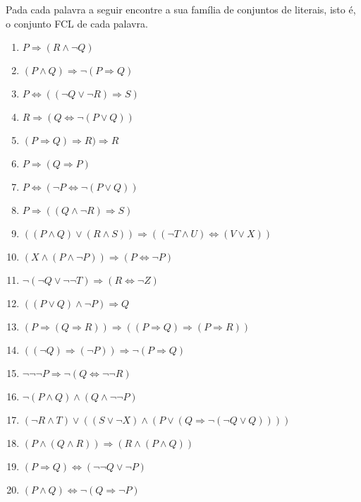 \begin{exercise}\label{exerc:LPro7}
    Pada cada palavra a seguir encontre a sua família de conjuntos de literais, isto é, o conjunto FCL de cada palavra.
\end{exercise}

\begin{enumerate}
    \item $P \Rightarrow (R \land \neg Q)$
    \item $(P \land Q) \Rightarrow \neg (P \Rightarrow Q)$
    \item $P \Leftrightarrow ((\neg Q \lor \neg R) \Rightarrow S)$
    \item $R \Rightarrow (Q \Leftrightarrow \neg (P \lor Q))$
    \item $(P \Rightarrow Q) \Rightarrow R) \Rightarrow R$
    \item $P \Rightarrow (Q \Rightarrow P)$
    \item $P \Leftrightarrow (\neg P \Leftrightarrow \neg (P \lor Q))$
    \item $P \Rightarrow ((Q \land \neg R) \Rightarrow S)$
    \item $((P \land Q) \lor (R \land S)) \Rightarrow ((\neg T \land U) \Leftrightarrow (V \lor X))$
    \item $(X \land (P \land \neg P)) \Rightarrow (P \Leftrightarrow \neg P)$
    \item $\neg(\neg Q \lor \neg \neg T) \Rightarrow (R \Leftrightarrow \neg Z)$
    \item $((P \lor Q) \land \neg P) \Rightarrow Q$
    \item $(P \Rightarrow (Q \Rightarrow R)) \Rightarrow ((P \Rightarrow Q) \Rightarrow (P \Rightarrow R))$
    \item $((\neg Q) \Rightarrow (\neg P)) \Rightarrow \neg (P \Rightarrow Q)$
    \item $\neg \neg \neg P \Rightarrow \neg (Q \Leftrightarrow \neg \neg R)$
    \item $\neg (P \land Q) \land (Q \land \neg \neg P)$
    \item $(\neg R \land T) \lor ((S \lor \neg X)\land(P \lor (Q \Rightarrow \neg(\neg Q \lor Q))))$
    \item $(P \land (Q \land R)) \Rightarrow (R \land (P \land Q))$
    \item $(P \Rightarrow Q) \Leftrightarrow (\neg \neg Q \lor \neg P)$
    \item $(P \land Q) \Leftrightarrow \neg (Q \Rightarrow \neg P)$
\end{enumerate}

